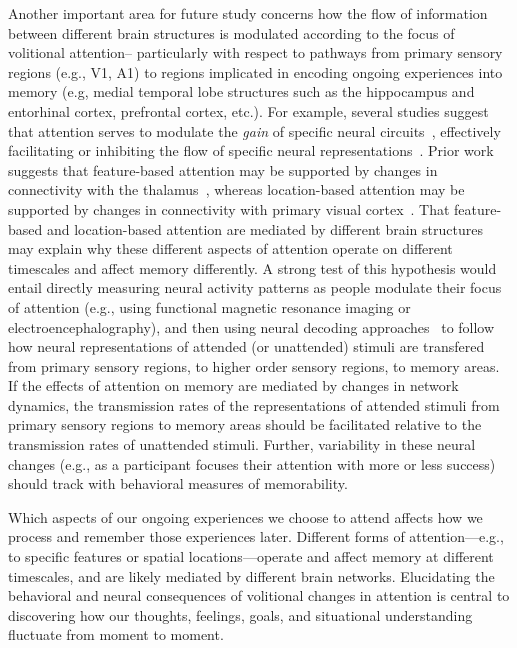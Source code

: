 \documentclass[english]{article}
\begin{document}
Another important area for future study concerns how the flow of information
between different brain structures is modulated according to the focus of
volitional attention-- particularly with respect to pathways from primary
sensory regions (e.g., V1, A1) to regions implicated in encoding ongoing
experiences into memory (e.g, medial temporal lobe structures such as the
hippocampus and entorhinal cortex, prefrontal cortex, etc.). For example,
several studies suggest that attention serves to modulate the \textit{gain} of
specific neural circuits~\citep{TreuTruj99, ChanEtal02, EldaEtal13,
SaliThie00}, effectively facilitating or inhibiting the flow of specific neural
representations~\citep{VartEtal07, LaRoEtal14}. Prior work suggests that
feature-based attention may be supported by changes in connectivity with the
thalamus~\citep{Schn11}, whereas location-based attention may be supported by
changes in connectivity with primary visual cortex~\citep{NoudEtal10}. That
feature-based and location-based attention are mediated by different brain
structures may explain why these different aspects of attention operate on
different timescales and affect memory differently. A strong test of this
hypothesis would entail directly measuring neural activity patterns as people
modulate their focus of attention (e.g., using functional magnetic resonance
imaging or electroencephalography), and then using neural decoding
approaches~\citep[e.g.,][]{HaxbEtal01, NormEtal06, MannEtal18} to follow how
neural representations of attended (or unattended) stimuli are transfered from
primary sensory regions, to higher order sensory regions, to memory areas. If
the effects of attention on memory are mediated by changes in network dynamics,
the transmission rates of the representations of attended stimuli from primary
sensory regions to memory areas should be facilitated relative to the
transmission rates of unattended stimuli. Further, variability in these neural
changes (e.g., as a participant focuses their attention with more or less
success) should track with behavioral measures of memorability.

Which aspects of our ongoing experiences we choose to attend affects how we
process and remember those experiences later. Different forms of
attention---e.g., to specific features or spatial locations---operate and
affect memory at different timescales, and are likely mediated by different
brain networks. Elucidating the behavioral and neural consequences of
volitional changes in attention is central to discovering how our thoughts,
feelings, goals, and situational understanding fluctuate from moment to moment.
\end{document}
